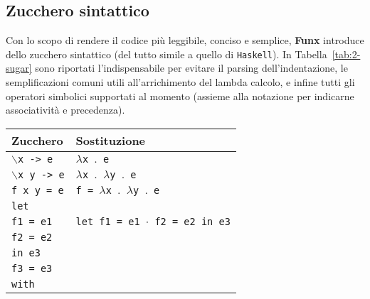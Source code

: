 \subsection{Zucchero sintattico}
\label{sec:2-4-syntactic-sugar}

Con lo scopo di rendere il codice più leggibile, conciso e semplice, \textbf{Funx} introduce
dello zucchero sintattico (del tutto simile a quello di \texttt{Haskell}).
In Tabella~\ref{tab:2-sugar} sono riportati l'indispensabile per evitare il parsing dell'indentazione,
le semplificazioni comuni utili all'arrichimento del lambda calcolo, e infine tutti gli operatori simbolici
supportati al momento (assieme alla notazione per indicarne associatività e precedenza).

\newpage

\begin{table}[H]
    \begin{center}
        \begin{tabularx}{\textwidth}{|P{15em}|X|}
            \hline
            \textbf{Zucchero}                & \textbf{Sostituzione}                                            \\
            \hline
            \texttt{$\backslash$x -> e}      & \texttt{$\lambda$x $\mathord{.}$ e}                              \\
            \hline
            \texttt{$\backslash$x y -> e}    & \texttt{$\lambda$x $\mathord{.}$ $\lambda$y $\mathord{.}$ e}     \\
            \hline
            \texttt{f x y = e}               & \texttt{f = $\lambda$x $\mathord{.}$ $\lambda$y $\mathord{.}$ e} \\
            \hline
            \texttt{let}                     &                                                                  \\
            \texttt{f1 = e1}                 & \texttt{let f1 = e1 $\cdot$ f2 = e2 in e3}                       \\
            \texttt{f2 = e2}                 &                                                                  \\
            \texttt{in e3}                   &                                                                  \\
            \hline
            \texttt{f3 = e3}                 &                                                                  \\
            \texttt{with}                    &                                                                  \\

\end{tabularx}
\end{center}
\end{table}
